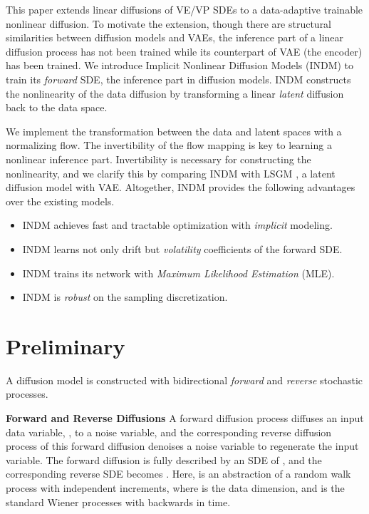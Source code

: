 \documentclass{article}
\theoremstyle{definition}
\theoremstyle{remark}
\begin{document}
	This paper extends linear diffusions of VE/VP SDEs to a data-adaptive trainable nonlinear diffusion. To motivate the extension, though there are structural similarities between diffusion models and VAEs, the inference part of a linear diffusion process has not been trained while its counterpart of VAE (the encoder) has been trained. We introduce Implicit Nonlinear Diffusion Models (INDM) to train its \textit{forward} SDE, the inference part in diffusion models. INDM constructs the nonlinearity of the data diffusion by transforming a linear \textit{latent} diffusion back to the data space.
	
	We implement the transformation between the data and latent spaces with a normalizing flow. The invertibility of the flow mapping is key to learning a nonlinear inference part. Invertibility is necessary for constructing the nonlinearity, and we clarify this by comparing INDM with LSGM \cite{vahdat2021score}, a latent diffusion model with VAE. Altogether, INDM provides the following advantages over the existing models.
	\vspace{-2mm}
	\begin{itemize}\setlength\itemsep{0.2em}
	\item INDM achieves fast and tractable optimization with \textit{implicit} modeling.
	\item INDM learns not only drift but \textit{volatility} coefficients of the forward SDE.
	\item INDM trains its network with \textit{Maximum Likelihood Estimation} (MLE).
	\item INDM is \textit{robust} on the sampling discretization.
	\end{itemize}
	\vspace{-2mm}
	
	\section{Preliminary}\label{preliminary}
	
	A diffusion model is constructed with bidirectional \textit{forward} and \textit{reverse} stochastic processes. 
	
	\textbf{Forward and Reverse Diffusions} A forward diffusion process diffuses an input data variable, , to a noise variable, and the corresponding reverse diffusion process \cite{anderson1982reverse} of this forward diffusion denoises a noise variable to regenerate the input variable. The forward diffusion is fully described by an SDE of , and the corresponding reverse SDE becomes . Here,  is an abstraction of a random walk process with independent increments, where  is the data dimension, and  is the standard Wiener processes with backwards in time. 
	
\end{document}
